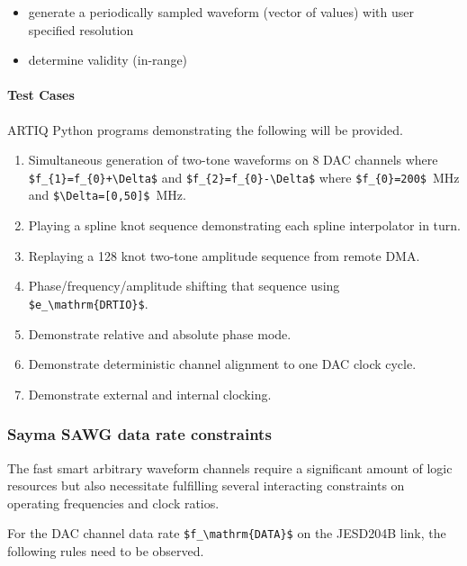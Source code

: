 \begin{itemize}
	\begin{itemize}
		\item
		generate a periodically sampled waveform (vector of values) with
		user specified resolution
		\item
		determine validity (in-range)
	\end{itemize}
\end{itemize}

\paragraph{Test Cases}\label{test-cases}

ARTIQ Python programs demonstrating the following will be provided.

\begin{enumerate}
	\def\labelenumi{\arabic{enumi}.}
	\item
	Simultaneous generation of two-tone waveforms on 8 DAC channels where
	\texttt{\$f\_\{1\}=f\_\{0\}+\textbackslash{}Delta\$} and
	\texttt{\$f\_\{2\}=f\_\{0\}-\textbackslash{}Delta\$} where
	\texttt{\$f\_\{0\}=200\$}~MHz and
	\texttt{\$\textbackslash{}Delta={[}0,50{]}\$}~MHz.
	\item
	Playing a spline knot sequence demonstrating each spline interpolator
	in turn.
	\item
	Replaying a 128 knot two-tone amplitude sequence from remote DMA.
	\item
	Phase/frequency/amplitude shifting that sequence using
	\texttt{\$e\_\textbackslash{}mathrm\{DRTIO\}\$}.
	\item
	Demonstrate relative and absolute phase mode.
	\item
	Demonstrate deterministic channel alignment to one DAC clock cycle.
	\item
	Demonstrate external and internal clocking.
\end{enumerate}

\subsubsection{Sayma SAWG data rate
	constraints}\label{sayma-sawg-data-rate-constraints}

The fast smart arbitrary waveform channels require a significant amount
of logic resources but also necessitate fulfilling several interacting
constraints on operating frequencies and clock ratios.

For the DAC channel data rate
\texttt{\$f\_\textbackslash{}mathrm\{DATA\}\$} on the JESD204B link, the
following rules need to be observed.

